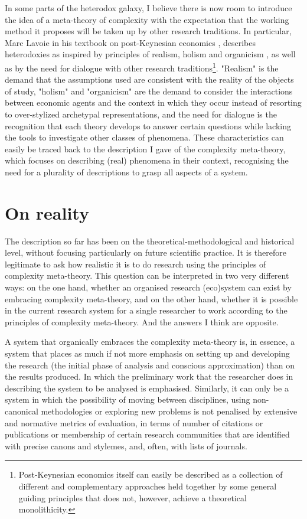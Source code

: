 \documentclass[a4paper, headings=standardclasses]{scrartcl}
\begin{document}
In some parts of the heterodox galaxy, I believe there is now room to introduce the idea of a meta-theory of complexity with the expectation that the working method it proposes will be taken up by other research traditions.
In particular, Marc Lavoie in his textbook on post-Keynesian economics \parencite{lavoie2022}, describes heterodoxies as inspired by principles of realism, holism and organicism \parencite[][p. 12]{lavoie2022}, as well as by the need for dialogue with other research traditions\footnote{Post-Keynesian economics itself can easily be described as a collection of different and complementary approaches held together by some general guiding principles that does not, however, achieve a theoretical monolithicity.}. "Realism" is the demand that the assumptions used are consistent with the reality of the objects of study, "holism" and "organicism" are the demand to consider the interactions between economic agents and the context in which they occur instead of resorting to over-stylized archetypal representations, and the need for dialogue is the recognition that each theory develops to answer certain questions while lacking the tools to investigate other classes of phenomena.
These characteristics can easily be traced back to the description I gave of the complexity meta-theory, which focuses on describing (real) phenomena in their context, recognising the need for a plurality of descriptions to grasp all aspects of a system.

\section{On reality}
The description so far has been on the theoretical-methodological and historical level, without focusing particularly on future scientific practice.
It is therefore legitimate to ask how realistic it is to do research using the principles of complexity meta-theory.
This question can be interpreted in two very different ways: on the one hand, whether an organised research (eco)system can exist by embracing complexity meta-theory, and on the other hand, whether it is possible in the current research system for a single researcher to work according to the principles of complexity meta-theory. And the answers I think are opposite.

A system that organically embraces the complexity meta-theory is, in essence, a system that places as much if not more emphasis on setting up and developing the research (the initial phase of analysis and conscious approximation) than on the results produced. In which the preliminary work that the researcher does in describing the system to be analysed is emphasised.
Similarly, it can only be a system in which the possibility of moving between disciplines, using non-canonical methodologies or exploring new problems is not penalised by extensive and normative metrics of evaluation, in terms of number of citations or publications or membership of certain research communities that are identified with precise canons and stylemes, and, often, with lists of journals.
\end{document}

